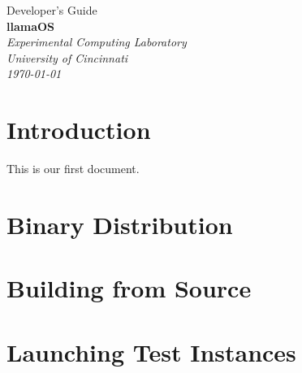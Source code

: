 \documentclass[draft]{article}
\begin{document}

\begin{titlepage}
\raggedleft
{\huge{Developer's Guide}\\[1.0in]}
{\Huge{\textbf{llamaOS}}\\[0.125in]}
{\Large{}}
\vfill
\itshape
Experimental Computing Laboratory\\
University of Cincinnati\\[0.125in]
\today
\end{titlepage}


\tableofcontents
\clearpage


\section{Introduction}
This is our first document.

\section{Binary Distribution}

\section{Building from Source}

\section{Launching Test Instances}
\end{document}
